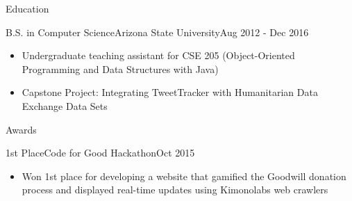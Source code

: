 \documentclass[]{mcdowellcv}
\begin{document}
	\begin{cvsection}{Education}
		\begin{cvsubsection}{B.S. in Computer Science}{Arizona State University}{Aug 2012 - Dec 2016}
			\begin{itemize}
				\item Undergraduate teaching assistant for CSE 205 (Object-Oriented Programming and Data Structures with Java)
				\item Capstone Project: Integrating TweetTracker with Humanitarian Data Exchange Data Sets
			\end{itemize}
		\end{cvsubsection}
	\end{cvsection}

	\begin{cvsection}{Awards}
		\begin{cvsubsection}{1st Place}{Code for Good Hackathon}{Oct 2015}
			\begin{itemize}
				\item Won 1st place for developing a website that gamified the Goodwill donation process and displayed real-time updates using Kimonolabs web crawlers
			\end{itemize}
		\end{cvsubsection}
	\end{cvsection}
\end{document}
